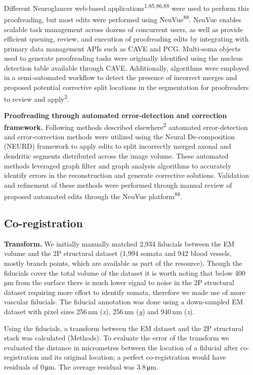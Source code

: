 \documentclass{article}
\begin{document}
Different Neuroglancer web-based applications\textsuperscript{1,85,86,88} were used to perform this proofreading, but most edits were performed using NeuVue\textsuperscript{88}. NeuVue enables scalable task management across dozens of concurrent users, as well as provide efficient queuing, review, and execution of proofreading edits by integrating with primary data management APIs such as CAVE and PCG. Multi-soma objects used to generate proofreading tasks were originally identified using the nucleus detection table available through CAVE. Additionally, algorithms were employed in a semi-automated workflow to detect the presence of incorrect merges and proposed potential corrective split locations in the segmentation for proofreaders to review and apply\textsuperscript{2}.

\textbf{Proofreading through automated error-detection and correction framework.} Following methods described elsewhere\textsuperscript{2} automated error-detection and error-correction methods were utilized using the Neural De-composition (NEURD) framework to apply edits to split incorrectly merged axonal and dendritic segments distributed across the image volume. These automated methods leveraged graph filter and graph analysis algorithms to accurately identify errors in the reconstruction and generate corrective solutions. Validation and refinement of these methods were performed through manual review of proposed automated edits through the NeuVue platform\textsuperscript{88}.

\subsection*{Co-registration}

\textbf{Transform.} We initially manually matched 2,934 fiducials between the EM volume and the 2P structural dataset (1,994 somata and 942 blood vessels, mostly branch points, which are available as part of the resource). Though the fiducials cover the total volume of the dataset it is worth noting that below 400\,µm from the surface there is much lower signal to noise in the 2P structural dataset requiring more effort to identify somata, therefore we made use of more vascular fiducials. The fiducial annotation was done using a down-sampled EM dataset with pixel sizes 256\,nm (\emph{x}), 256\,nm (\emph{y}) and 940\,nm (\emph{z}).

Using the fiducials, a transform between the EM dataset and the 2P structural stack was calculated (Methods). To evaluate the error of the transform we evaluated the distance in micrometres between the location of a fiducial after co-registration and its original location; a perfect co-registration would have residuals of 0\,μm. The average residual was 3.8\,μm.
\end{document}
